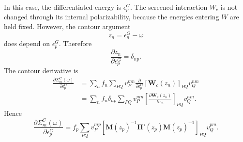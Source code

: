 In this case, the differentiated energy is \(\epsilon_p^G\).  The screened
interaction \(W_c\) is not changed through its internal polarizability, because
the energies entering \(W\) are held fixed.  However, the contour argument
\begin{equation}
    z_n=\epsilon_n^G-\omega
\end{equation}
does depend on \(\epsilon_p^G\).  Therefore
\begin{equation}
    \frac{\partial z_n}{\partial \epsilon_p^G}
    =
    \delta_{np}.
\end{equation}
The contour derivative is
\begin{align}
    \frac{\partial \Sigma_m^C(\omega)}
    {\partial \epsilon_p^G}
    &=
    \sum_n f_n
    \sum_{PQ}
    v_P^{mn}
    \frac{\partial}
    {\partial \epsilon_p^G}
    \left[
    \mathbf W_c(z_n)
    \right]_{PQ}
    v_Q^{nm} \\
    &=
    \sum_n f_n
    \delta_{np}
    \sum_{PQ}
    v_P^{mn}
    \left[
    \frac{\partial \mathbf W_c(z_n)}{\partial z_n}
    \right]_{PQ}
    v_Q^{nm}.
\end{align}
Hence
\begin{equation}
    \boxed{
    \frac{\partial \Sigma_m^C(\omega)}
    {\partial \epsilon_p^G}
    =
    f_p
    \sum_{PQ}
    v_P^{mp}
    \left[
    \mathbf M(z_p)^{-1}
    \boldsymbol{\Pi}'(z_p)
    \mathbf M(z_p)^{-1}
    \right]_{PQ}
    v_Q^{pm}
    }.
\end{equation}

